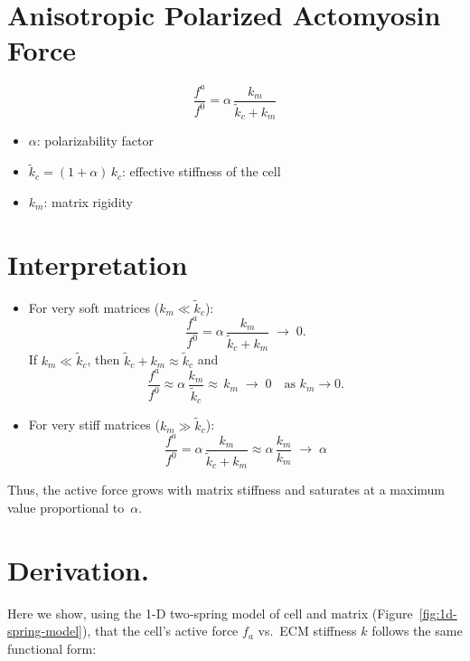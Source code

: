 \documentclass{article}
\begin{document}
\section*{Anisotropic Polarized Actomyosin Force}

\[
  \frac{f^{a}}{f^{0}}
  = \alpha \,\frac{k_{m}}{\tilde{k}_{c} + k_{m}}
\]

\begin{itemize}
  \item $\displaystyle \alpha$: polarizability factor
  \item $\displaystyle \tilde{k}_{c} = (1 + \alpha)\,k_{c}$: effective stiffness of the cell
  \item $k_{m}$: matrix rigidity
\end{itemize}

\section*{Interpretation}

\begin{itemize}
  \item For very soft matrices (\(k_{m}\ll \tilde{k}_{c}\)):
    \[
      \frac{f^{a}}{f^{0}}
      = \alpha \,\frac{k_{m}}{\tilde{k}_{c} + k_{m}}
      \;\longrightarrow\;0.
    \]
    If \(k_{m}\ll \tilde{k}_{c}\), then \(\tilde{k}_{c}+k_{m}\approx \tilde{k}_{c}\) and
    \[
      \frac{f^{a}}{f^{0}}
      \approx \alpha \,\frac{k_{m}}{\tilde{k}_{c}}
       \approx  \,k_{m}
      \;\longrightarrow\;0
      \quad\text{as }k_{m}\to 0.
    \]
  \item For very stiff matrices (\(k_{m}\gg \tilde{k}_{c}\)):
    \[
      \frac{f^{a}}{f^{0}}
      = \alpha \,\frac{k_{m}}{\tilde{k}_{c} + k_{m}}
      \approx \alpha \,\frac{k_{m}}{k_{m}} 
      \;\longrightarrow\;\alpha
    \] 
\end{itemize}

Thus, the active force grows with matrix stiffness and  
saturates at a maximum value proportional to~$\alpha$.

\section*{Derivation.}

Here we show, using the 1-D two‐spring model of cell and matrix  (Figure~\ref{fig:1d-spring-model}),
that the cell’s active force \(f_a\) vs.\ ECM stiffness \(k\) follows the
same functional form:
\end{document}

